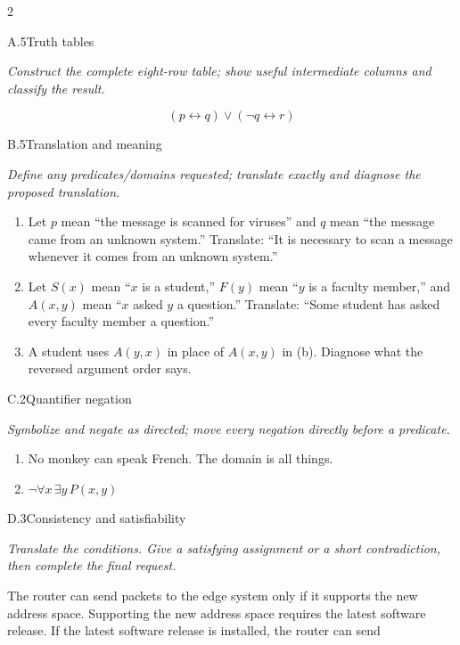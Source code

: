 \documentclass[9pt]{extarticle}
\begin{document}
\begin{multicols}{2}
\begin{CoreProblem}{A.5}{Truth tables}
{\scriptsize\textit{Construct the complete eight-row table; show useful intermediate columns and classify the result.}\par}
\[
  (p\leftrightarrow q)\lor(\neg q\leftrightarrow r)
\]
\end{CoreProblem}
\begin{CoreProblem}{B.5}{Translation and meaning}
{\scriptsize\textit{Define any predicates/domains requested; translate exactly and diagnose the proposed translation.}\par}
\begin{enumerate}[label=(\alph*)]
  \item Let $p$ mean ``the message is scanned for viruses'' and $q$ mean ``the
        message came from an unknown system.'' Translate: ``It is necessary to
        scan a message whenever it comes from an unknown system.''
  \item Let $S(x)$ mean ``$x$ is a student,'' $F(y)$ mean ``$y$ is a faculty
        member,'' and $A(x,y)$ mean ``$x$ asked $y$ a question.'' Translate:
        ``Some student has asked every faculty member a question.''
  \item A student uses $A(y,x)$ in place of $A(x,y)$ in (b). Diagnose what the
        reversed argument order says.
\end{enumerate}
\end{CoreProblem}
\begin{CoreProblem}{C.2}{Quantifier negation}
{\scriptsize\textit{Symbolize and negate as directed; move every negation directly before a predicate.}\par}
\begin{enumerate}[label=(\alph*)]
  \item No monkey can speak French. The domain is all things.
  \item $\neg\forall x\,\exists y\,P(x,y)$
\end{enumerate}
\end{CoreProblem}
\columnbreak
\begin{CoreProblem}{D.3}{Consistency and satisfiability}
{\scriptsize\textit{Translate the conditions. Give a satisfying assignment or a short contradiction, then complete the final request.}\par}
The router can send packets to the edge system only if it supports the new
address space. Supporting the new address space requires the latest software
release. If the latest software release is installed, the router can send

\end{CoreProblem}
\end{multicols}
\end{document}
